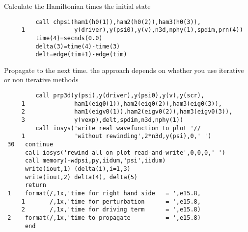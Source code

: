 \documentclass{article}
\begin{document}
        Calculate the Hamiltonian times the initial state             
\begin{verbatim}
         call chpsi(ham1(h0(1)),ham2(h0(2)),ham3(h0(3)),
     1              y(driver),y(psi0),y(v),n3d,nphy(1),spdim,prn(4))
         time(4)=secnds(0.0)
         delta(3)=time(4)-time(3)
         delt=edge(tim+1)-edge(tim)
\end{verbatim}
        Propagate to the next time.  the approach depends on whether
        you use iterative or non iterative methods
\begin{verbatim}
         call prp3d(y(psi),y(driver),y(psi0),y(v),y(scr),
     1              ham1(eig0(1)),ham2(eig0(2)),ham3(eig0(3)),
     2              ham1(eigv0(1)),ham2(eigv0(2)),ham3(eigv0(3)),
     3              y(vexp),delt,spdim,n3d,nphy(1))
         call iosys('write real wavefunction to plot '//
     1              'without rewinding',2*n3d,y(psi),0,' ')
 30   continue   
      call iosys('rewind all on plot read-and-write',0,0,0,' ')
      call memory(-wdpsi,py,iidum,'psi',iidum)
      write(iout,1) (delta(i),i=1,3)
      write(iout,2) delta(4), delta(5)
      return
 1    format(/,1x,'time for right hand side   = ',e15.8,
     1       /,1x,'time for perturbation      = ',e15.8,
     2       /,1x,'time for driving term      = ',e15.8)
 2    format(/,1x,'time to propagate          = ',e15.8)
      end
\end{verbatim}
\end{document}
